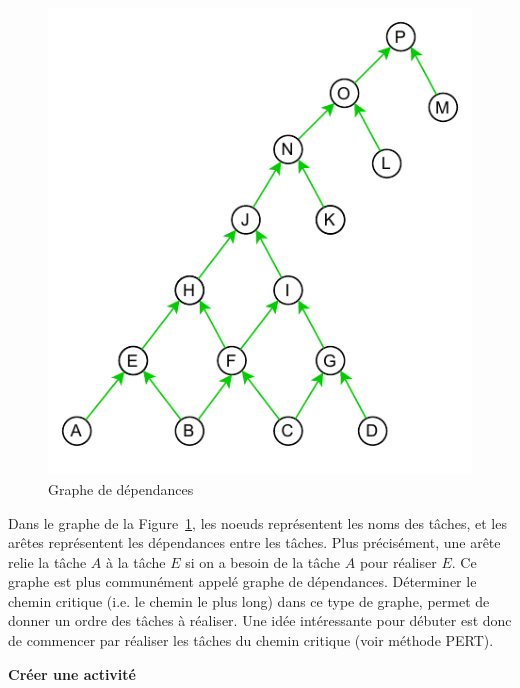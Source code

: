 \documentclass{article}
\begin{document}
\begin{figure}[ht]
    \centering
\includegraphics[scale = 1.3]{assets/graph.pdf}
\caption{Graphe de dépendances}
\label{fig:graphe}
\end{figure}

Dans le graphe de la Figure~\ref{fig:graphe}, les noeuds représentent les noms des tâches, et les arêtes représentent les dépendances entre les tâches. Plus précisément, une arête relie la tâche $A$ à la tâche $E$ si on a besoin de la tâche $A$ pour réaliser $E$. Ce graphe est plus communément appelé graphe de dépendances. Déterminer le chemin critique (i.e. le chemin le plus long) dans ce type de graphe, permet de donner un ordre des tâches à réaliser. Une idée intéressante pour débuter est donc de commencer par réaliser les tâches du chemin critique (voir méthode PERT).


\newpage

\begin{center}
    {\Large\textbf{Créer une activité}}
\end{center}
\end{document}
